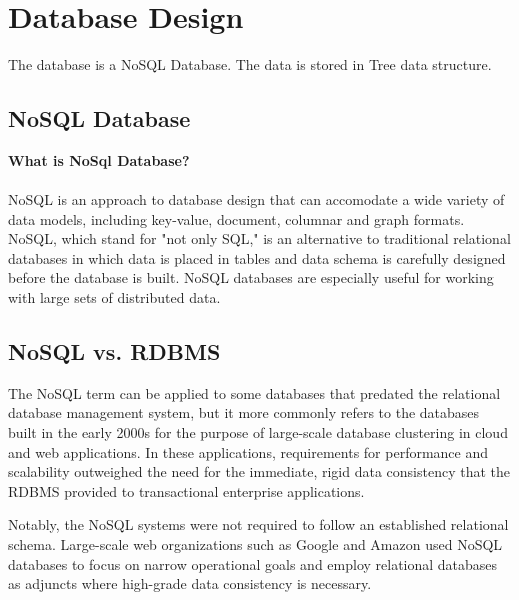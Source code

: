 \section{Database Design}
The database is a NoSQL Database. The data is stored in Tree data structure.\\
\subsection{NoSQL Database}
\textbf{What is NoSql Database?}\\
\\
NoSQL is an approach to database design that can accomodate a wide variety of data models, including key-value, document, columnar and graph formats. NoSQL, which stand for "not only SQL," is an alternative to traditional relational databases in which data is placed in tables and data schema is carefully designed before the database is built. NoSQL databases are especially useful for working with large sets of distributed data.\\
\subsection{NoSQL vs. RDBMS}
The NoSQL term can be applied to some databases that predated the relational database management system, but it more commonly refers to the databases built in the early 2000s for the purpose of large-scale database clustering in cloud and web applications. In these applications, requirements for performance and scalability outweighed the need for the immediate, rigid data consistency that the RDBMS provided to transactional enterprise applications.

Notably, the NoSQL systems were not required to follow an established relational schema. Large-scale web organizations such as Google and Amazon used NoSQL databases to focus on narrow operational goals and employ relational databases as adjuncts where high-grade data consistency is necessary.

